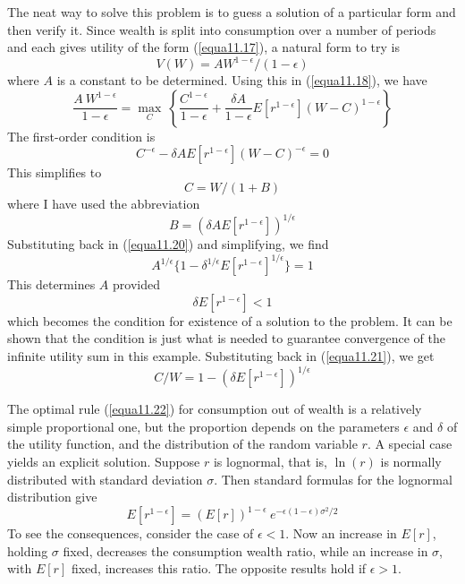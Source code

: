 The neat way to solve this problem is to guess a solution of a particular form and then verify it. Since wealth is split into consumption over a number of periods and each gives utility of the form (\ref{equa11.17}), a natural form to try is 
\begin{equation} \label{equa11.19}
 V(W) = A W^{1-\epsilon} / (1-\epsilon)
\end{equation}
where $A$ is a constant to be determined. Using this in (\ref{equa11.18}), we have
\begin{equation} \label{equa11.20}
  \dfrac{A \ W^{1-\epsilon}}{1-\epsilon} = \mathop{\max}\limits_C \ \left\{ \dfrac{C^{1-\epsilon}}{1-\epsilon} +\dfrac{\delta A}{1-\epsilon} E[r^{1-\epsilon}] (W-C)^{1-\epsilon}   \right\}
\end{equation}
The first-order condition is 
\begin{equation*}
C^{-\epsilon} - \delta A E[r^{1-\epsilon}] (W-C)^{-\epsilon} = 0
\end{equation*}
This simplifies to 
\begin{equation} \label{equa11.21}
 C = W/(1+B)
\end{equation}
where I have used the abbreviation
\begin{equation*}
  B = \left( \delta A E[r^{1-\epsilon}]  \right)^{1/\epsilon}
\end{equation*}
Substituting back in (\ref{equa11.20}) and simplifying, we find
\begin{equation*}
   A^{1/\epsilon} \{ 1 - \delta^{1/\epsilon} E[r^{1-\epsilon}]^{1/\epsilon} \}  = 1
\end{equation*}
This determines $A$ provided
\begin{equation*}
  \delta E[r^{1-\epsilon}] < 1
\end{equation*}
which becomes the condition for existence of a solution to the problem. It can be shown that the condition is just what is needed to guarantee convergence of the infinite utility sum in this example. Substituting back in (\ref{equa11.21}), we get
\begin{equation} \label{equa11.22}
  C/W = 1 - \left( \delta E[r^{1-\epsilon}]  \right)^{1/\epsilon}
\end{equation}

The optimal rule (\ref{equa11.22}) for consumption out of wealth is a relatively simple proportional one, but the proportion depends on the parameters $\epsilon$ and $\delta$ of the utility function, and the distribution of the random variable $r$. A special case yields an explicit solution. Suppose $r$ is lognormal, that is, $\ln(r)$ is normally distributed with standard deviation $\sigma$. Then standard formulas for the lognormal distribution give
\begin{equation*}
  E[r^{1-\epsilon}] = (E[r])^{1-\epsilon} \ e^{-\epsilon(1-\epsilon) \sigma^2/ 2}
\end{equation*}
To see the consequences, consider the case of $\epsilon <1$. Now an increase in $E[r]$, holding $\sigma$ fixed, decreases the consumption wealth ratio, while an increase in $\sigma$, with $E[r]$ fixed, increases this ratio. The opposite results hold if $\epsilon > 1$.

